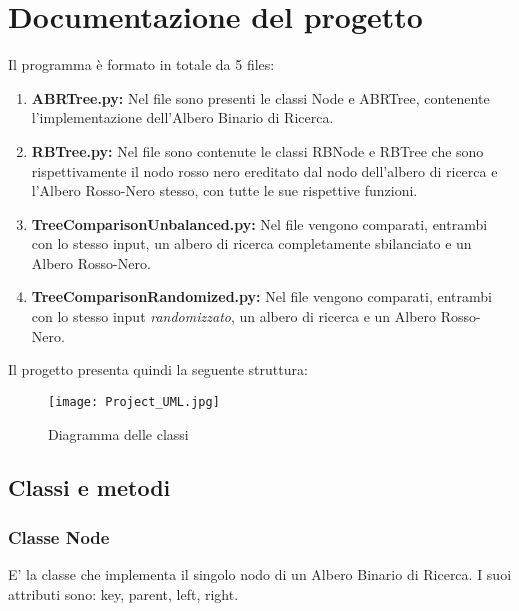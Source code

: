 \documentclass{article}
\begin{document}
\section{Documentazione del progetto}
Il programma è formato in totale da 5 files:
\begin{enumerate}[label={\roman*.)}, ref={\roman*.)}]
    \item \textbf{ABRTree.py:} Nel file sono presenti le classi Node e ABRTree, contenente l'implementazione dell'Albero Binario di Ricerca.
    \item \textbf{RBTree.py:} Nel file sono contenute le classi RBNode e RBTree che sono rispettivamente il nodo rosso nero ereditato dal nodo dell'albero di ricerca e l'Albero Rosso-Nero stesso, con tutte le sue rispettive funzioni.
    \item \textbf{TreeComparisonUnbalanced.py:} Nel file vengono comparati, entrambi con lo stesso input, un albero di ricerca completamente sbilanciato e un Albero Rosso-Nero.
    \item \textbf{TreeComparisonRandomized.py:} Nel file vengono comparati, entrambi con lo stesso input \textit{randomizzato}, un albero di ricerca e un Albero Rosso-Nero.
\end{enumerate}

Il progetto presenta quindi la seguente struttura:
\begin{figure}[!hb]
        \centering
        \texttt{[image: Project\_UML.jpg]}
        \caption{Diagramma delle classi}
        \label{fig:Project_UML}
\end{figure}

\subsection{Classi e metodi}
\subsubsection{Classe Node}
E' la classe che implementa il singolo nodo di un Albero Binario di Ricerca.
I suoi attributi sono: key, parent, left, right.
\end{document}
